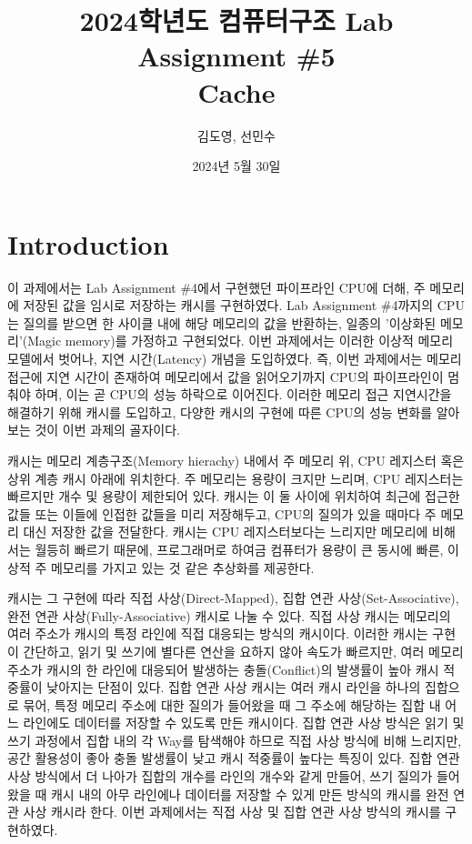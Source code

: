 \documentclass[openright, a4paper]{article}
\title{2024학년도 컴퓨터구조 Lab Assignment \#5\\
        Cache}
\author{김도영, 선민수}
\date{2024년 5월 30일}
\begin{document}
\maketitle


\section{Introduction}
이 과제에서는 Lab Assignment \#4에서 구현했던 파이프라인 CPU에 더해, 주 메모리에 
저장된 값을 임시로 저장하는 캐시를 구현하였다. Lab Assignment \#4까지의 CPU는 
질의를 받으면 한 사이클 내에 해당 메모리의 값을 반환하는, 일종의 '이상화된 
메모리'(Magic memory)를 가정하고 구현되었다. 이번 과제에서는 이러한 이상적 메모리 
모델에서 벗어나, 지연 시간(Latency) 개념을 도입하였다. 즉, 이번 과제에서는 메모리 
접근에 지연 시간이 존재하여 메모리에서 값을 읽어오기까지 CPU의 파이프라인이 
멈춰야 하며, 이는 곧 CPU의 성능 하락으로 이어진다. 이러한 메모리 접근 지연시간을
해결하기 위해 캐시를 도입하고, 다양한 캐시의 구현에 따른 CPU의 성능 변화를 
알아보는 것이 이번 과제의 골자이다.

캐시는 메모리 계층구조(Memory hierachy) 내에서 주 메모리 위, CPU 레지스터 혹은 
상위 계층 캐시 아래에 위치한다. 주 메모리는 용량이 크지만 느리며, CPU 레지스터는 
빠르지만 개수 및 용량이 제한되어 있다. 캐시는 이 둘 사이에 위치하여 최근에 
접근한 값들 또는 이들에 인접한 값들을 미리 저장해두고, CPU의 질의가 있을 
때마다 주 메모리 대신 저장한 값을 전달한다. 캐시는 CPU 레지스터보다는 느리지만 
메모리에 비해서는 월등히 빠르기 때문에, 프로그래머로 하여금 컴퓨터가 용량이 큰 
동시에 빠른, 이상적 주 메모리를 가지고 있는 것 같은 추상화를 제공한다. 

캐시는 그 구현에 따라 직접 사상(Direct-Mapped), 집합 연관 사상(Set-Associative),
완전 연관 사상(Fully-Associative) 캐시로 나눌 수 있다. 직접 사상 캐시는 메모리의
여러 주소가 캐시의 특정 라인에 직접 대응되는 방식의 캐시이다. 이러한 캐시는
구현이 간단하고, 읽기 및 쓰기에 별다른 연산을 요하지 않아 속도가 빠르지만, 
여러 메모리 주소가 캐시의 한 라인에 대응되어 발생하는 충돌(Conflict)의 발생률이
높아 캐시 적중률이 낮아지는 단점이 있다. 집합 연관 사상 캐시는 여러 캐시 라인을
하나의 집합으로 묶어, 특정 메모리 주소에 대한 질의가 들어왔을 때 그 주소에 
해당하는 집합 내 어느 라인에도 데이터를 저장할 수 있도록 만든 캐시이다. 집합
연관 사상 방식은 읽기 및 쓰기 과정에서 집합 내의 각 Way를 탐색해야 하므로
직접 사상 방식에 비해 느리지만, 공간 활용성이 좋아 충돌 발생률이 낮고 캐시 
적중률이 높다는 특징이 있다. 집합 연관 사상 방식에서 더 나아가 집합의 개수를
라인의 개수와 같게 만들어, 쓰기 질의가 들어왔을 때 캐시 내의 아무 라인에나 
데이터를 저장할 수 있게 만든 방식의 캐시를 완전 연관 사상 캐시라 한다. 이번 
과제에서는 직접 사상 및 집합 연관 사상 방식의 캐시를 구현하였다.
\end{document}
